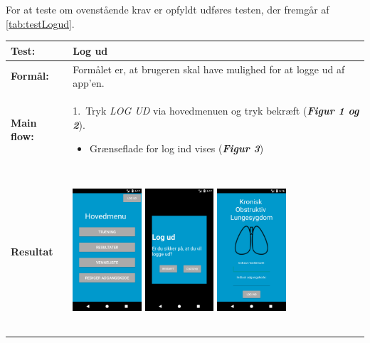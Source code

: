 \noindent
For at teste om ovenstående krav er opfyldt udføres testen, der fremgår af \autoref{tab:testLogud}.

  \begin{longtable}{ | l | p{13cm} |} \hline
    \textbf{Test:} & Log ud \\ \hline
  \textbf{Formål:} & Formålet er, at brugeren skal have mulighed for at logge ud af app’en.
 \\ \hline
 	\textbf{Main flow:} & 1.~Tryk \textit{LOG UD} via hovedmenuen og tryk bekræft (\textbf{\textit{Figur 1 og 2}}).
 	\begin{itemize}
 	\item Grænseflade for log ind vises  (\textbf{\textit{Figur 3}})
 	\end{itemize}	
\\ \hline
\textbf{Resultat} &  \hspace{1.5mm}  \raisebox{-\totalheight}    {\includegraphics[width=0.24\textwidth, height=60mm]{figures/test/logud2}} 
\hspace{5mm}
        \raisebox{-\totalheight}
    {\includegraphics[width=0.24\textwidth, height=60mm]{figures/test/logud3}} 
    \hspace{5mm}
        \raisebox{-\totalheight}
    {\includegraphics[width=0.24\textwidth, height=60mm]{figures/test/logud1}} \vspace{3mm}

\end{longtable}
